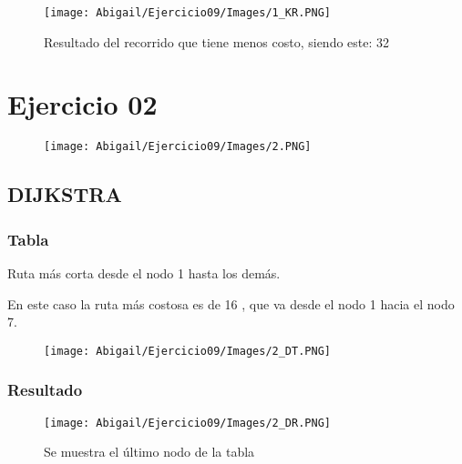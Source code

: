 \documentclass[12pt]{article}
\begin{document}
        \begin{figure}[h!]
          \centering
            \texttt{[image: Abigail/Ejercicio09/Images/1\_KR.PNG]}
            \caption{Resultado del recorrido que tiene menos costo, siendo este: 32}
        \end{figure} 

  
  \section{Ejercicio 02}

    \begin{figure}[h!]
      \centering
      \texttt{[image: Abigail/Ejercicio09/Images/2.PNG]}
    \end{figure} 

    \subsection{DIJKSTRA}

      \subsubsection{Tabla}
        Ruta más corta desde el nodo 1 hasta los demás.
        
        En este caso la ruta más costosa es de 16 , que va desde el nodo 1 hacia el nodo 7.
        
        \begin{figure}[h!]
          \centering
          \texttt{[image: Abigail/Ejercicio09/Images/2\_DT.PNG]}
        \end{figure} 

      \subsubsection{Resultado}
        \begin{figure}[h!]
          \centering
          \texttt{[image: Abigail/Ejercicio09/Images/2\_DR.PNG]}
          \caption{Se muestra el último nodo de la tabla}
        \end{figure} 

 \newpage
\end{document}
